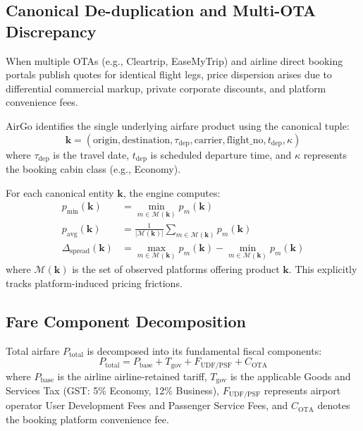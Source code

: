\documentclass[11pt,a4paper]{article}
\begin{document}
\subsection{Canonical De-duplication and Multi-OTA Discrepancy}
When multiple OTAs (e.g., Cleartrip, EaseMyTrip) and airline direct booking portals publish quotes for identical flight legs, price dispersion arises due to differential commercial markup, private corporate discounts, and platform convenience fees. 

AirGo identifies the single underlying airfare product using the canonical tuple:
\begin{equation}
\mathbf{k} = \left(\text{origin}, \text{destination}, \tau_{\text{dep}}, \text{carrier}, \text{flight\_no}, t_{\text{dep}}, \kappa\right)
\end{equation}
where $\tau_{\text{dep}}$ is the travel date, $t_{\text{dep}}$ is scheduled departure time, and $\kappa$ represents the booking cabin class (e.g., Economy).

For each canonical entity $\mathbf{k}$, the engine computes:
\begin{align}
p_{\text{min}}(\mathbf{k}) &= \min_{m \in \mathcal{M}(\mathbf{k})} p_m(\mathbf{k}) \\
p_{\text{avg}}(\mathbf{k}) &= \frac{1}{|\mathcal{M}(\mathbf{k})|} \sum_{m \in \mathcal{M}(\mathbf{k})} p_m(\mathbf{k}) \\
\Delta_{\text{spread}}(\mathbf{k}) &= \max_{m \in \mathcal{M}(\mathbf{k})} p_m(\mathbf{k}) - \min_{m \in \mathcal{M}(\mathbf{k})} p_m(\mathbf{k})
\end{align}
where $\mathcal{M}(\mathbf{k})$ is the set of observed platforms offering product $\mathbf{k}$. This explicitly tracks platform-induced pricing frictions.

\subsection{Fare Component Decomposition}
Total airfare $P_{\text{total}}$ is decomposed into its fundamental fiscal components:
\begin{equation}
P_{\text{total}} = P_{\text{base}} + T_{\text{gov}} + F_{\text{UDF/PSF}} + C_{\text{OTA}}
\end{equation}
where $P_{\text{base}}$ is the airline airline-retained tariff, $T_{\text{gov}}$ is the applicable Goods and Services Tax (GST: 5\% Economy, 12\% Business), $F_{\text{UDF/PSF}}$ represents airport operator User Development Fees and Passenger Service Fees, and $C_{\text{OTA}}$ denotes the booking platform convenience fee.
\end{document}
